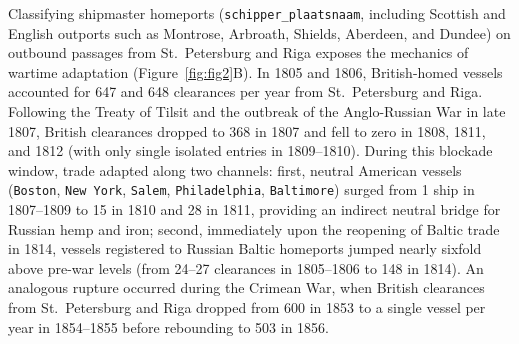 \documentclass[11pt,a4paper]{article}
\begin{document}
Classifying shipmaster homeports (\texttt{schipper\_plaatsnaam}, including Scottish and English outports such as Montrose, Arbroath, Shields, Aberdeen, and Dundee) on outbound passages from St.~Petersburg and Riga exposes the mechanics of wartime adaptation (Figure~\ref{fig:fig2}B). In 1805 and 1806, British-homed vessels accounted for 647 and 648 clearances per year from St.~Petersburg and Riga. Following the Treaty of Tilsit and the outbreak of the Anglo-Russian War in late 1807, British clearances dropped to 368 in 1807 and fell to zero in 1808, 1811, and 1812 (with only single isolated entries in 1809--1810). During this blockade window, trade adapted along two channels: first, neutral American vessels (\texttt{Boston}, \texttt{New York}, \texttt{Salem}, \texttt{Philadelphia}, \texttt{Baltimore}) surged from 1 ship in 1807--1809 to 15 in 1810 and 28 in 1811, providing an indirect neutral bridge for Russian hemp and iron; second, immediately upon the reopening of Baltic trade in 1814, vessels registered to Russian Baltic homeports jumped nearly sixfold above pre-war levels (from 24--27 clearances in 1805--1806 to 148 in 1814). An analogous rupture occurred during the Crimean War, when British clearances from St.~Petersburg and Riga dropped from 600 in 1853 to a single vessel per year in 1854--1855 before rebounding to 503 in 1856.
\end{document}
